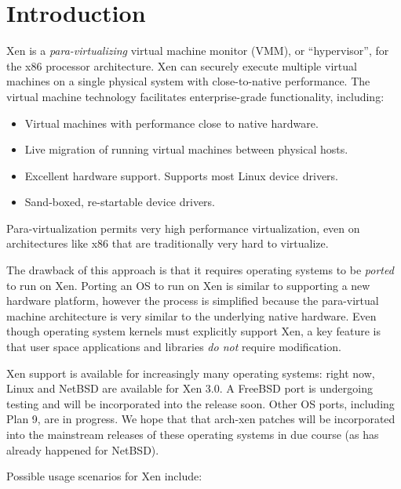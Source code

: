 \chapter{Introduction}


Xen is a \emph{para-virtualizing} virtual machine monitor (VMM), or
``hypervisor'', for the x86 processor architecture. Xen can securely
execute multiple virtual machines on a single physical system with
close-to-native performance. The virtual machine technology facilitates
enterprise-grade functionality, including:

\begin{itemize}
\item Virtual machines with performance close to native hardware.
\item Live migration of running virtual machines between physical hosts.
\item Excellent hardware support. Supports most Linux device drivers.
\item Sand-boxed, re-startable device drivers.
\end{itemize}

Para-virtualization permits very high performance virtualization, even
on architectures like x86 that are traditionally very hard to
virtualize.

The drawback of this approach is that it requires operating systems to
be \emph{ported} to run on Xen. Porting an OS to run on Xen is similar
to supporting a new hardware platform, however the process is simplified
because the para-virtual machine architecture is very similar to the
underlying native hardware. Even though operating system kernels must
explicitly support Xen, a key feature is that user space applications
and libraries \emph{do not} require modification.

Xen support is available for increasingly many operating systems: right
now, Linux and NetBSD are available for Xen 3.0. A FreeBSD port is
undergoing testing and will be incorporated into the release soon. Other
OS ports, including Plan 9, are in progress. We hope that that arch-xen
patches will be incorporated into the mainstream releases of these
operating systems in due course (as has already happened for NetBSD).

Possible usage scenarios for Xen include:

